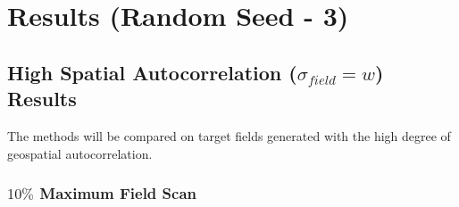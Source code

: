 \chapter{Results (Random Seed - 3)}
\section{High Spatial Autocorrelation ($\sigma_{field} = w$) Results}
The methods will be compared on target fields generated with the high degree of geospatial autocorrelation.

\clearpage
\subsection{$10\%$ Maximum Field Scan}
